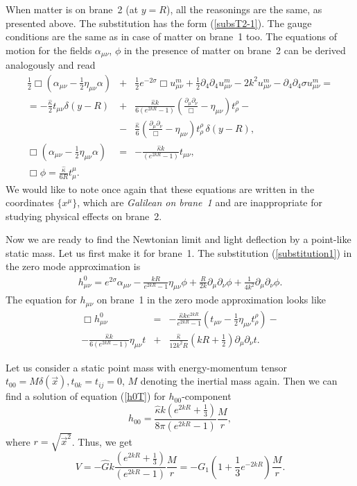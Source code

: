 \documentclass[a4paper,12pt]{article}
\begin{document}
When  matter is  on brane~2 (at $y=R$), all the reasonings are the
same, as presented above. The substitution has the form
(\ref{subsT2-1}). The gauge conditions are the same as in case of
matter on brane~1 too. The equations of motion for the fields
$\alpha_{\mu\nu}$, $\phi$ in the presence of matter on brane~2 can
be derived analogously and read
\begin{eqnarray}
\frac{1}{2}\Box(\alpha_{\mu\nu}-\frac{1}{2}\eta_{\mu\nu}\alpha) &+&
\frac{1}{2}e^{-2\sigma}\Box u^m_{\mu\nu}+\frac{1}{2}\partial_4
\partial_4 u^m_{\mu\nu}-2k^2u^m_{\mu\nu}-\partial_4
\partial_4\sigma u^m_{\mu\nu}= \\ \nonumber
=-\frac{\hat\kappa}{2}t_{\mu\nu}\delta(y-R)&+&\frac{\hat\kappa k
}{6(e^{2kR}-1)}\left(\frac{\partial_\mu\partial_\nu}{\Box}-\eta_{\mu\nu}\right)
t^{\rho}_{\rho}- \\ \nonumber
 &-& \frac{\hat \kappa}{6}\left(\frac{\partial_\mu\partial_\nu}
{\Box}-\eta_{\mu\nu}\right)t^{\rho}_{\rho}\,\delta(y-R),\\
\Box (\alpha_{\mu\nu}-\frac{1}{2}\eta_{\mu\nu}\alpha)
&=&-\frac{\hat\kappa k}{(e^{2kR}-1)}t_{\mu\nu},\\
\Box \phi=\frac{\hat\kappa}{6R}t_\mu^\mu.&&
\end{eqnarray}
We would like to note once again that these equations are written in the
coordinates $\{x^{\mu}\}$, which are {\it Galilean on brane~1} and are
inappropriate for studying physical effects on brane~2.

Now we are ready to find the  Newtonian limit and light deflection
by a point-like static mass. Let us first make it for brane~1. The
substitution (\ref{substitution1}) in the zero mode approximation
is
\begin{eqnarray}\label{subst0}
h^{0}_{\mu\nu}=e^{2\sigma}\alpha_{\mu\nu}-\frac{kR}{e^{2kR}-1}\eta_{\mu\nu}\phi+
\frac{R}{2k} \partial_\mu\partial_\nu\phi+\frac{1}{4k^2} \partial_\mu\partial_\nu\phi.
\end{eqnarray}
The equation for $h_{\mu\nu}$ on brane~1 in the zero mode
approximation looks like
\begin{eqnarray}\label{h0T}
\Box h^0_{\mu\nu}&=&-\frac{\hat \kappa k
e^{2kR}}{e^{2kR}-1}\left(t_{\mu\nu}-\frac{1}{2}\eta_{\mu\nu}t^{\rho}_{\rho}\right)-
\\ \nonumber -
\frac{\hat \kappa k
}{6(e^{2kR}-1)}\eta_{\mu\nu}t &+& \frac{\hat
\kappa}{12k^2
R}\left(kR+\frac{1}{2}\right)\partial_{\mu}\partial_{\nu}t.
\end{eqnarray}

Let us consider a static point mass with energy-momentum tensor
$t_{00}=M\delta(\vec x), t_{0k}=t_{ij}=0$, $M$ denoting the
inertial mass again. Then we can find a solution of equation
(\ref{h0T}) for $h_{00}$-component
\begin{equation}
h_{00}=\frac{\hat\kappa k
(e^{2kR}+\frac{1}{3})}{8\pi(e^{2kR}-1)}\frac{M}{r},
\end{equation}
where $r=\sqrt{{\vec x}^2}$.
Thus,  we get
\begin{equation}\label{V1}
V=-\hat G k\frac{ (e^{2kR}+\frac{1}{3})}{(e^{2kR}-1)}\frac{M}{r}=
-G_{1}\left(1+\frac{1}{3}e^{-2kR}\right)\frac{M}{r}.
\end{equation}
\end{document}
